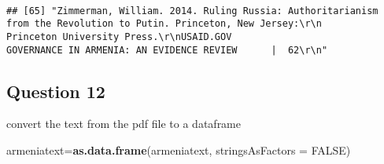 \documentclass[
]{article}
\newenvironment{Shaded}{\begin{snugshade}}{\end{snugshade}}
\newcommand{\DataTypeTok}[1]{\textcolor[rgb]{0.13,0.29,0.53}{#1}}
\newcommand{\KeywordTok}[1]{\textcolor[rgb]{0.13,0.29,0.53}{\textbf{#1}}}
\newcommand{\NormalTok}[1]{#1}
\newcommand{\OtherTok}[1]{\textcolor[rgb]{0.56,0.35,0.01}{#1}}
\begin{document}
\begin{verbatim}
                                                                                                                                                                                                                                                                                                                                                                                                                                                                                                                                                                                                                                                                                                                                                                                                                                                                                                                                                                                                                                                                                                                                                                                                                                                                                                                                                                                                                                                                                                                                                                                                                                                                                                                                                                                    
## [65] "Zimmerman, William. 2014. Ruling Russia: Authoritarianism from the Revolution to Putin. Princeton, New Jersey:\r\n        Princeton University Press.\r\nUSAID.GOV                                                  GOVERNANCE IN ARMENIA: AN EVIDENCE REVIEW      |  62\r\n"
\end{verbatim}

\hypertarget{question-12}{%
\subsection{Question 12}\label{question-12}}

convert the text from the pdf file to a dataframe

\begin{Shaded}
\begin{Highlighting}[]
\NormalTok{armeniatext=}\KeywordTok{as.data.frame}\NormalTok{(armeniatext, }\DataTypeTok{stringsAsFactors =} \OtherTok{FALSE}\NormalTok{)}
\end{Highlighting}
\end{Shaded}
\end{document}
